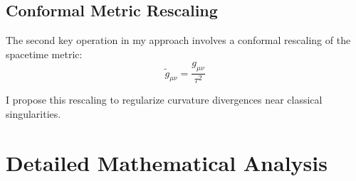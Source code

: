 \documentclass[11pt,a4paper]{article}
\begin{document}
\subsection{Conformal Metric Rescaling}

The second key operation in my approach involves a conformal rescaling of the spacetime metric:
\begin{equation}
\tilde{g}_{\mu\nu} = \frac{g_{\mu\nu}}{\tau^2}
\end{equation}

I propose this rescaling to regularize curvature divergences near classical singularities.

\section{Detailed Mathematical Analysis}
\end{document}
